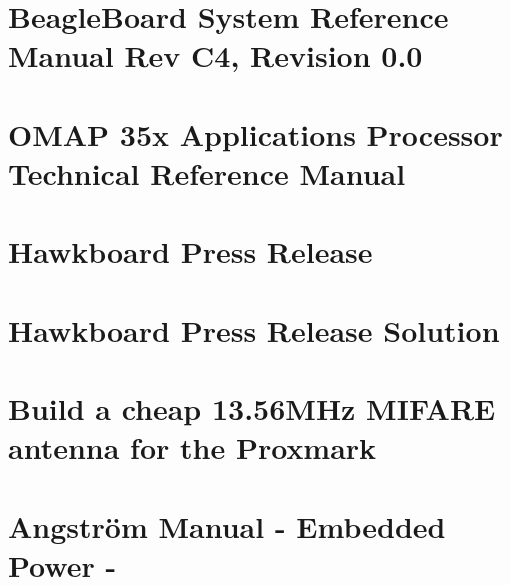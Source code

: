 \section{BeagleBoard System Reference Manual Rev C4, Revision 0.0}


\section{OMAP 35x Applications Processor Technical Reference Manual}


\section{Hawkboard Press Release}

\section{Hawkboard Press Release Solution}


\section{Build a cheap 13.56MHz MIFARE antenna for the Proxmark}


\section{Angström Manual - Embedded Power -}
